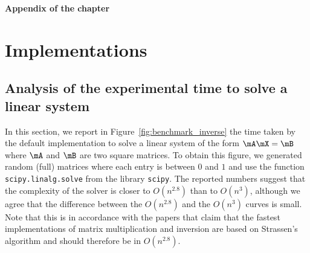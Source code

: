 \begin{subappendices}

\begin{center}
    \bfseries \Large Appendix of the chapter
\end{center}

\section{Implementations}
\label{apx:implementation}

\subsection{Analysis of the experimental time to solve a linear system}
\label{apx:inversion}

In this section, we report in Figure~\ref{fig:benchmark_inverse} the time taken by the default implementation to solve a linear system of the form $\mA\mX=\mB$ where $\mA$ and $\mB$ are two square matrices. To obtain this figure, we generated random (full) matrices where each entry is between $0$ and $1$ and use the function  \texttt{scipy.linalg.solve} from the library \texttt{scipy}. The reported numbers suggest that the complexity of the solver is closer to $O(n^{2.8})$ than to $O(n^3)$, although we agree that the difference between the $O(n^{2.8})$ and the $O(n^3)$ curves is small. Note that this is in accordance with the papers \cite{huang2016strassen,huang2018practical} that claim that the fastest implementations of matrix multiplication and inversion are based on Strassen's algorithm and should therefore be in $O(n^{2.8})$. 


\end{subappendices}

